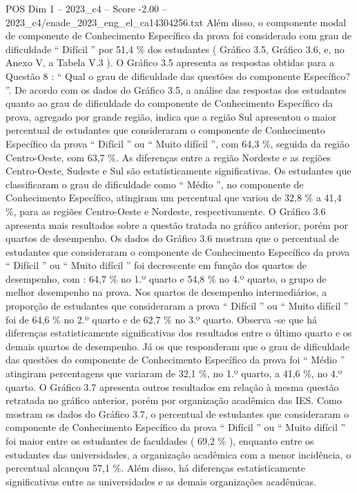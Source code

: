\begin{textsample}{POS Dim 1 – 2023\_c4 – Score -2.00 – 2023\_c4/enade\_2023\_eng\_el\_ca14304256.txt}
Além disso, o componente modal de componente de Conhecimento Específico da prova foi considerado com grau de dificuldade “ Difícil ” por 51,4 \% dos estudantes ( Gráfico 3.5, Gráfico 3.6, e, no Anexo V, a Tabela V.3 ).
O Gráfico 3.5 apresenta as respostas obtidas para a Questão 8 : “ Qual o grau de dificuldade das questões do componente Específico? ”.
De acordo com os dados do Gráfico 3.5, a análise das respostas dos estudantes quanto ao grau de dificuldade do componente de Conhecimento Específico da prova, agregado por grande região, indica que a região Sul apresentou o maior percentual de estudantes que consideraram o componente de Conhecimento Específico da prova “ Difícil ” ou “ Muito difícil ”, com 64,3 \%, seguida da região Centro-Oeste, com 63,7 \%.
As diferenças entre a região Nordeste e as regiões Centro-Oeste, Sudeste e Sul são estatisticamente significativas.
Os estudantes que classificaram o grau de dificuldade como “ Médio ”, no componente de Conhecimento Específico, atingiram um percentual que variou de 32,8 \% a 41,4 \%, para as regiões Centro-Oeste e Nordeste, respectivamente.
O Gráfico 3.6 apresenta mais resultados sobre a questão tratada no gráfico anterior, porém por quartos de desempenho.
Os dados do Gráfico 3.6 mostram que o percentual de estudantes que consideraram o componente de Conhecimento Específico da prova “ Difícil ” ou “ Muito difícil ” foi decrescente em função dos quartos de desempenho, com : 64,7 \% no 1.º quarto e 54,8 \% no 4.º quarto, o grupo de melhor desempenho na prova.
Nos quartos de desempenho intermediários, a proporção de estudantes que consideraram a prova “ Difícil ” ou “ Muito difícil ” foi de 64,6 \% no 2.º quarto e de 62,7 \% no 3.º quarto.
Observa -se que há diferenças estatisticamente significativas dos resultados entre o último quarto e os demais quartos de desempenho.
Já os que responderam que o grau de dificuldade das questões do componente de Conhecimento Específico da prova foi “ Médio ” atingiram percentagens que variaram de 32,1 \%, no 1.º quarto, a 41,6 \%, no 4.º quarto.
O Gráfico 3.7 apresenta outros resultados em relação à mesma questão retratada no gráfico anterior, porém por organização acadêmica das IES.
Como mostram os dados do Gráfico 3.7, o percentual de estudantes que consideraram o componente de Conhecimento Específico da prova “ Difícil ” ou “ Muito difícil ” foi maior entre os estudantes de faculdades ( 69,2 \% ), enquanto entre os estudantes das universidades, a organização acadêmica com a menor incidência, o percentual alcançou 57,1 \%.
Além disso, há diferenças estatisticamente significativas entre as universidades e as demais organizações acadêmicas.

\end{textsample}
